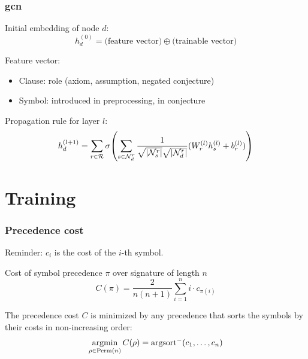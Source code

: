 \documentclass[a4paper]{beamer}
\begin{document}
\begin{frame}
\frametitle{\Acrfull{gcn}}

Initial embedding of node $d$:
$$
h_d^{(0)} = \textrm{(feature vector)} \oplus \textrm{(trainable vector)}
$$

Feature vector:
\begin{itemize}
\item Clause: role (axiom, assumption, negated conjecture)
\item Symbol: introduced in preprocessing, in conjecture
\end{itemize}

Propagation rule for layer $l$:
$$
h_d^{(l+1)} =
\sum_{r \in \mathcal{R}} \sigma \Parentheses*{\sum_{s \in \mathcal{N}_d^r} \frac{1}{\sqrt{\card{\mathcal{N}_s^r}} \sqrt{\card{\mathcal{N}_d^r}}} (W_r^{(l)} h_s^{(l)} + b_r^{(l)})}
$$

\end{frame}

\section{Training}

\begin{frame}
\frametitle{Precedence cost}
Reminder: $c_i$ is the cost of the $i$-th symbol.

\begin{block}{Cost of symbol precedence $\pi$ over signature of length $n$}
\begin{equation*}
C(\pi) = \frac{2}{n(n+1)} \sum_{i=1}^n i \cdot c_{\pi(i)}
\end{equation*}
\end{block}

\begin{lemma}
The precedence cost $C$ is minimized by any precedence that sorts the symbols by their costs in non-increasing order:
$$
\operatorname*{argmin}_{\rho \in \mathrm{Perm}(n)} C(\rho) = \operatorname{argsort}^- (c_1, \ldots, c_n)
$$
\end{lemma}

\end{frame}
\end{document}
